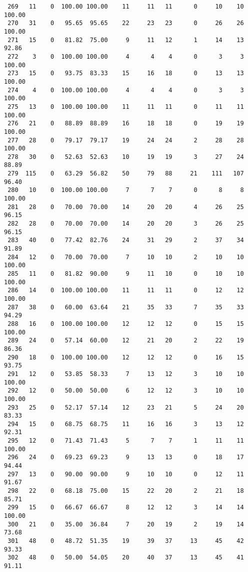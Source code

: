 \begin{verbatim}
 269   11    0  100.00 100.00    11     11   11      0     10    10   100.00
 270   31    0   95.65  95.65    22     23   23      0     26    26   100.00
 271   15    0   81.82  75.00     9     11   12      1     14    13    92.86
 272    3    0  100.00 100.00     4      4    4      0      3     3   100.00
 273   15    0   93.75  83.33    15     16   18      0     13    13   100.00
 274    4    0  100.00 100.00     4      4    4      0      3     3   100.00
 275   13    0  100.00 100.00    11     11   11      0     11    11   100.00
 276   21    0   88.89  88.89    16     18   18      0     19    19   100.00
 277   28    0   79.17  79.17    19     24   24      2     28    28   100.00
 278   30    0   52.63  52.63    10     19   19      3     27    24    88.89
 279  115    0   63.29  56.82    50     79   88     21    111   107    96.40
 280   10    0  100.00 100.00     7      7    7      0      8     8   100.00
 281   28    0   70.00  70.00    14     20   20      4     26    25    96.15
 282   28    0   70.00  70.00    14     20   20      3     26    25    96.15
 283   40    0   77.42  82.76    24     31   29      2     37    34    91.89
 284   12    0   70.00  70.00     7     10   10      2     10    10   100.00
 285   11    0   81.82  90.00     9     11   10      0     10    10   100.00
 286   14    0  100.00 100.00    11     11   11      0     12    12   100.00
 287   38    0   60.00  63.64    21     35   33      7     35    33    94.29
 288   16    0  100.00 100.00    12     12   12      0     15    15   100.00
 289   24    0   57.14  60.00    12     21   20      2     22    19    86.36
 290   18    0  100.00 100.00    12     12   12      0     16    15    93.75
 291   12    0   53.85  58.33     7     13   12      3     10    10   100.00
 292   12    0   50.00  50.00     6     12   12      3     10    10   100.00
 293   25    0   52.17  57.14    12     23   21      5     24    20    83.33
 294   15    0   68.75  68.75    11     16   16      3     13    12    92.31
 295   12    0   71.43  71.43     5      7    7      1     11    11   100.00
 296   24    0   69.23  69.23     9     13   13      0     18    17    94.44
 297   13    0   90.00  90.00     9     10   10      0     12    11    91.67
 298   22    0   68.18  75.00    15     22   20      2     21    18    85.71
 299   15    0   66.67  66.67     8     12   12      3     14    14   100.00
 300   21    0   35.00  36.84     7     20   19      2     19    14    73.68
 301   48    0   48.72  51.35    19     39   37     13     45    42    93.33
 302   48    0   50.00  54.05    20     40   37     13     45    41    91.11

\end{verbatim}

